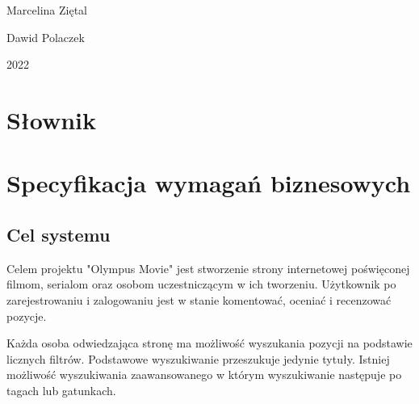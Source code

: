 \documentclass[12pt]{article}
\begin{document}
\begin{titlepage}
\begin{minipage}{0.4\textwidth}
\begin{flushright}
			Marcelina Ziętal
			
			Dawid Polaczek
		\end{flushright}
	\end{minipage}
	
	
	\vspace{\fill}
	2022
	
	
	
\end{titlepage}
	
	\tableofcontents
	\pagebreak
	

	\section{Słownik}	%
		
	\section{Specyfikacja wymagań biznesowych}
	
		\subsection{Cel systemu}	%
		Celem projektu "Olympus Movie" jest stworzenie strony internetowej poświęconej filmom, serialom oraz osobom uczestniczącym w ich tworzeniu. Użytkownik po zarejestrowaniu i zalogowaniu jest w stanie komentować, oceniać i recenzować pozycje.
	
	Każda osoba odwiedzająca stronę ma możliwość wyszukania pozycji na podstawie licznych filtrów. Podstawowe wyszukiwanie przeszukuje jedynie tytuły. Istniej możliwość wyszukiwania zaawansowanego w którym wyszukiwanie następuje po tagach lub gatunkach.
	
\end{document}
